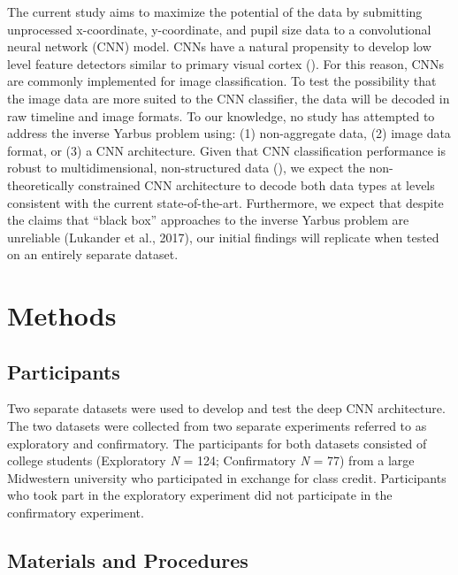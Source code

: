 \documentclass[
  english,
  man]{apa6}
\begin{document}
The current study aims to maximize the potential of the data by submitting unprocessed x-coordinate, y-coordinate, and pupil size data to a convolutional neural network (CNN) model. CNNs have a natural propensity to develop low level feature detectors similar to primary visual cortex (). For this reason, CNNs are commonly implemented for image classification. To test the possibility that the image data are more suited to the CNN classifier, the data will be decoded in raw timeline and image formats. To our knowledge, no study has attempted to address the inverse Yarbus problem using: (1) non-aggregate data, (2) image data format, or (3) a CNN architecture. Given that CNN classification performance is robust to multidimensional, non-structured data (), we expect the non-theoretically constrained CNN architecture to decode both data types at levels consistent with the current state-of-the-art. Furthermore, we expect that despite the claims that \enquote{black box} approaches to the inverse Yarbus problem are unreliable (Lukander et al., 2017), our initial findings will replicate when tested on an entirely separate dataset.

\section{Methods}

\subsection{Participants}

Two separate datasets were used to develop and test the deep CNN architecture. The two datasets were collected from two separate experiments referred to as exploratory and confirmatory. The participants for both datasets consisted of college students (Exploratory \emph{N} = 124; Confirmatory \emph{N} = 77) from a large Midwestern university who participated in exchange for class credit. Participants who took part in the exploratory experiment did not participate in the confirmatory experiment.

\subsection{Materials and Procedures}
\end{document}
